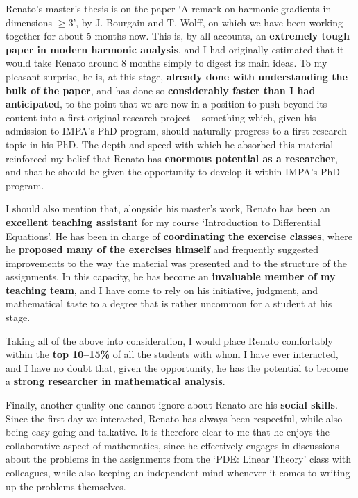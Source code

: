 \documentclass[a4paper,11pt]{letter}
\begin{document}
	Renato's master's thesis is on the paper `A remark on harmonic gradients in dimensions $\geq 3$', by J. Bourgain and T. Wolff, on which we have been working together for about 5 months now. This is, by all accounts, an {\bf extremely tough paper in modern harmonic analysis}, and I had originally estimated that it would take Renato around 8 months simply to digest its main ideas. To my pleasant surprise, he is, at this stage, {\bf already done with understanding the bulk of the paper}, and has done so {\bf considerably faster than I had anticipated}, to the point that we are now in a position to push beyond its content into a first original research project -- something which, given his admission to IMPA's PhD program, should naturally progress to a first research topic in his PhD. The depth and speed with which he absorbed this material reinforced my belief that Renato has {\bf enormous potential as a researcher}, and that he should be given the opportunity to develop it within IMPA's PhD program.

I should also mention that, alongside his master's work, Renato has been an {\bf excellent teaching assistant} for my course `Introduction to Differential Equations'. He has been in charge of {\bf coordinating the exercise classes}, where he {\bf proposed many of the exercises himself} and frequently suggested improvements to the way the material was presented and to the structure of the assignments. In this capacity, he has become an {\bf invaluable member of my teaching team}, and I have come to rely on his initiative, judgment, and mathematical taste to a degree that is rather uncommon for a student at his stage.

Taking all of the above into consideration, I would place Renato comfortably within the {\bf top 10--15\%} of all the students with whom I have ever interacted, and I have no doubt that, given the opportunity, he has the potential to become a {\bf strong researcher in mathematical analysis}.
	
	Finally, another quality one cannot ignore about Renato are his {\bf social skills}. Since the first day we interacted, Renato has always been respectful, while also being easy-going and talkative. It is therefore clear to me that he enjoys the collaborative aspect of mathematics,  since he effectively engages in discussions about the problems in the assignments from the `PDE: Linear Theory' class with colleagues, while also keeping an independent mind whenever it comes to writing up the problems themselves. 
	
\end{document}
